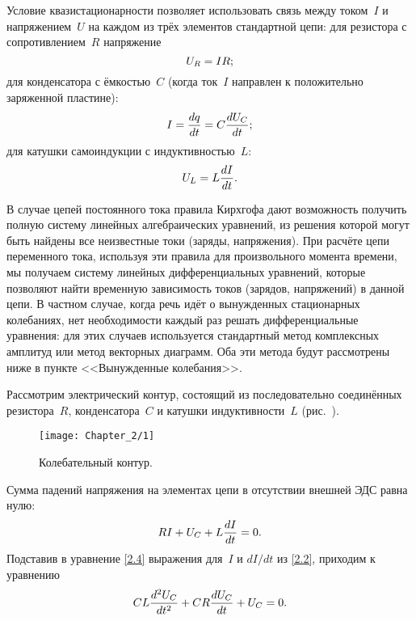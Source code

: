Условие квазистационарности позволяет использовать связь между током~$I$ и
напряжением~$U$ на каждом из трёх элементов стандартной цепи:
для резистора с сопротивлением~$R$ напряжение
\begin{equation}
	\eqmark{2.1}
	U_R=IR;
\end{equation}
для конденсатора с ёмкостью~$C$ (когда ток~$I$ направлен к положительно
заряженной пластине):
\begin{equation}
	\eqmark{2.2}
	I=\dfrac{dq}{dt}=C\dfrac{dU_C}{dt};
\end{equation}
для катушки самоиндукции с индуктивностью~$L$:
\begin{equation}
	\eqmark{2.3}
	U_L=L\dfrac{dI}{dt}.
\end{equation}

В случае цепей постоянного тока правила Кирхгофа дают возможность получить
полную систему линейных алгебраических уравнений, из решения которой могут быть
найдены все неизвестные токи (заряды, напряжения). При расчёте цепи переменного
тока, используя эти правила для произвольного момента времени, мы получаем
систему линейных дифференциальных уравнений, которые позволяют найти временную
зависимость токов (зарядов, напряжений) в данной цепи. В частном случае, когда
речь идёт о вынужденных стационарных колебаниях, нет необходимости каждый раз
решать дифференциальные уравнения: для этих случаев используется стандартный
метод комплексных амплитуд или метод векторных диаграмм. Оба эти метода будут
рассмотрены ниже в пункте <<Вынужденные колебания>>.


Рассмотрим электрический контур, состоящий из последовательно соединённых
резистора~$R$, конденсатора~$C$ и катушки индуктивности~$L$
(рис.~).

\begin{figure}[h!]
	\centering\texttt{[image: Chapter\_2/1]}
	\caption{Колебательный контур.}
\end{figure}


Сумма падений напряжения на элементах цепи в отсутствии внешней ЭДС равна нулю:
\begin{equation}
	\eqmark{2.4}
	RI+U_C+L\dfrac{dI}{dt}=0.
\end{equation}
Подставив в уравнение \eqref{2.4} выражения для~$I$ и $dI/dt$ из \eqref{2.2},
приходим к уравнению
\begin{equation}
	\eqmark{2.5}
	CL\dfrac{d^2U_C}{dt^2}+CR\dfrac{dU_C}{dt}+U_C=0.
\end{equation}

